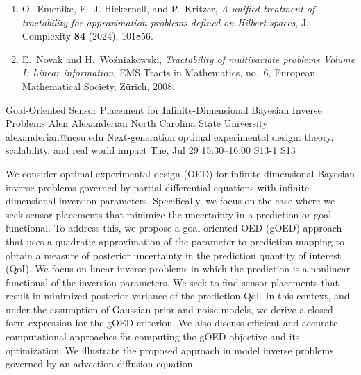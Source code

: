 \begin{talk}
\begin{enumerate}
 \item
O.~Emenike, F.~J. Hickernell, and P.~Kritzer, \emph{A unified treatment of tractability for approximation problems defined on {H}ilbert spaces}, J. Complexity \textbf{84} (2024), 101856.

\item 
E.~Novak and H.~Wo{\'{z}}niakowski, \emph{Tractability of multivariate problems {V}olume {I}: {L}inear information}, EMS Tracts in Mathematics, no.~6, European Mathematical Society, Z\"urich, 2008.

\end{enumerate}


\end{talk}

\begin{talk}
  {Goal-Oriented Sensor Placement for Infinite-Dimensional Bayesian Inverse Problems}%
  {Alen Alexanderian}%
  {North Carolina State University}%
  {alexanderian@ncsu.edu}%
  {Next-generation optimal experimental design: theory, scalability, and real world impact}%
  {}%
  {Tue, Jul 29 15:30--16:00}%
  {S13-1}%
  {S13}%
    
   
We consider optimal experimental design (OED) for infinite-dimensional Bayesian
inverse problems governed by partial differential equations with
infinite-dimensional inversion parameters.  Specifically, we focus on the case
where we seek sensor placements that minimize the uncertainty in a prediction or
goal functional.  To address this, we propose a goal-oriented OED (gOED)
approach that uses a quadratic approximation of the parameter-to-prediction
mapping to obtain a measure of posterior uncertainty in the prediction quantity
of interest (QoI).  We focus on linear inverse problems in which the prediction
is a nonlinear functional of the inversion parameters. We seek to find sensor
placements that result in minimized posterior variance of the prediction QoI. In
this context, and under the assumption of Gaussian prior and noise models, we
derive a closed-form expression for the gOED criterion. We also discuss
efficient and accurate computational approaches for computing the gOED objective
and its optimization.  We illustrate the proposed approach in model inverse
problems governed by an advection-diffusion equation.

\medskip

\end{talk}

